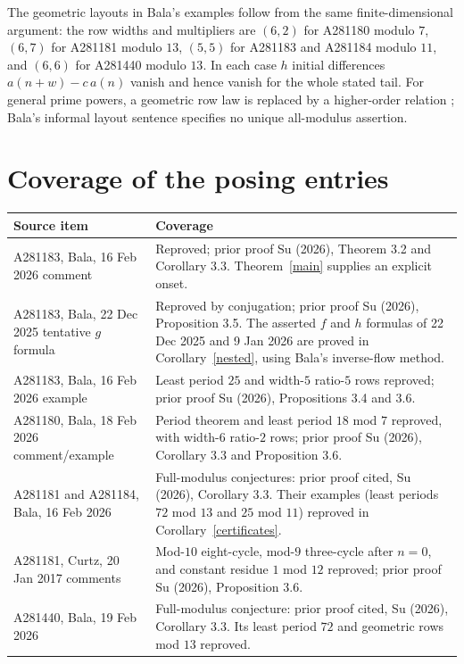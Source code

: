 \documentclass[11pt]{article}
\begin{document}
The geometric layouts in Bala's examples follow from the same
finite-dimensional argument: the row widths and multipliers are
$(6,2)$ for A281180 modulo $7$, $(6,7)$ for A281181 modulo $13$,
$(5,5)$ for A281183 and A281184 modulo $11$, and $(6,6)$ for
A281440 modulo $13$. In each case $h$ initial differences
$a(n+w)-c\,a(n)$ vanish and hence vanish for the whole stated tail.
For general prime powers, a geometric row law is replaced by a
higher-order relation \cite[Proposition 3.4]{su}; Bala's informal
layout sentence specifies no unique all-modulus assertion.

\section{Coverage of the posing entries}

\begin{center}
\small
\begin{tabular}{p{.28\linewidth}p{.62\linewidth}}
\toprule
Source item & Coverage \\
\midrule
A281183, Bala, 16 Feb 2026 comment & Reproved; prior proof Su (2026), Theorem 3.2 and Corollary 3.3. Theorem~\ref{main} supplies an explicit onset. \\
A281183, Bala, 22 Dec 2025 tentative $g$ formula & Reproved by conjugation; prior proof Su (2026), Proposition 3.5. The asserted $f$ and $h$ formulas of 22 Dec 2025 and 9 Jan 2026 are proved in Corollary~\ref{nested}, using Bala's inverse-flow method. \\
A281183, Bala, 16 Feb 2026 example & Least period $25$ and width-$5$ ratio-$5$ rows reproved; prior proof Su (2026), Propositions 3.4 and 3.6. \\
A281180, Bala, 18 Feb 2026 comment/example & Period theorem and least period $18$ mod $7$ reproved, with width-$6$ ratio-$2$ rows; prior proof Su (2026), Corollary 3.3 and Proposition 3.6. \\
A281181 and A281184, Bala, 16 Feb 2026 & Full-modulus conjectures: prior proof cited, Su (2026), Corollary 3.3. Their examples (least periods $72$ mod $13$ and $25$ mod $11$) reproved in Corollary~\ref{certificates}. \\
A281181, Curtz, 20 Jan 2017 comments & Mod-$10$ eight-cycle, mod-$9$ three-cycle after $n=0$, and constant residue $1$ mod $12$ reproved; prior proof Su (2026), Proposition 3.6. \\
A281440, Bala, 19 Feb 2026 & Full-modulus conjecture: prior proof cited, Su (2026), Corollary 3.3. Its least period $72$ and geometric rows mod $13$ reproved. \\

\end{tabular}
\end{center}
\end{document}
